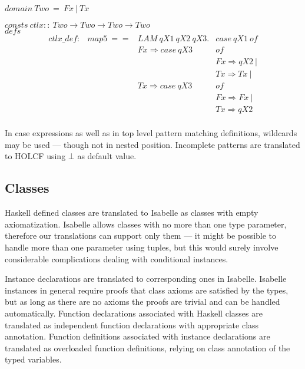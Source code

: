 \documentclass{llncs}
\begin{document}
\noindent $domain \ Two \ = \ Fx \ | \ Tx $

\noindent $consts \ ctlx :: \ Two \to Two \to Two \to Two$\\

\noindent $defs$
$$\begin{array}{llll}
ctlx\_def : & map5 \ == & LAM \ qX1 \ qX2 \ qX3. & case \ qX1 \ of \\
                                             & & Fx \Rightarrow case \ qX3 & of \\
                                             & & & Fx \Rightarrow qX2 \ | \\
                                             & & & Tx \Rightarrow Tx \ | \\
                                             & & Tx \Rightarrow case \ qX3 & of \\
                                             & & & Fx \Rightarrow Fx \ | \\
                                             & & & Tx \Rightarrow qX2 \\
\end{array}$$

\noindent In case expressions as well as in top level pattern matching
definitions, wildcards may be used --- though not in nested position.
Incomplete patterns are translated to HOLCF using $\bot$ as default
value.

\subsection{Classes}

Haskell defined classes are translated to Isabelle as classes with
empty axiomatization.  Isabelle allows classes with no more than one
type parameter, therefore our translations can support only them ---
it might be possible to handle more than one parameter using tuples,
but this would surely involve considerable complications dealing with
conditional instances.

Instance declarations are translated to corresponding ones in
Isabelle. Isabelle instances in general require proofs that class
axioms are satisfied by the types, but as long as there are no axioms
the proofs are trivial and can be handled automatically.  Function
declarations associated with Haskell classes are translated as
independent function declarations with appropriate class annotation.
Function definitions associated with instance declarations are
translated as overloaded function definitions,
relying on class annotation of the typed variables.\\
\end{document}
